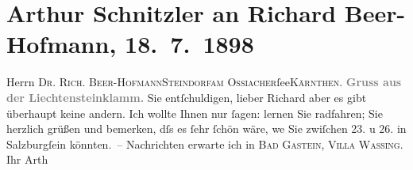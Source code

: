 

         
         \renewcommand{\erwaehntePersonen}{Personen: Richard Beer-Hofmann}
         \renewcommand{\erwaehnteOrte}{Orte: Kärnten, Liechtensteinklamm, Ossiacher See, Salzburg, St. Johann im Pongau, Steindorf am Ossiacher See, Villa Dr. Wassing}
         \renewcommand{\erwaehnteWerke}{}
               \section[Arthur Schnitzler an Richard Beer-Hofmann, 18. 7. 1898]{ Arthur Schnitzler an Richard Beer-Hofmann, 18. 7. 1898}\nopagebreak{}\rehead{ }\begin{ledgroupsized}[t]{13cm}\normalsize\beginnumbering \toendnotes[C]{\smallbreak\pagebreak[2]} 
\pstart{}{\pb}Herrn \textsc{Dr. Rich.
                     Beer-Hofmann}\pend{}\pstart{}\textsc{Steindorf}\pend{}\pstart{}\textsc{am Ossiacher}ſee\pend{}\pstart{}\textsc{Kärnthen}.\pend{}{\bigskip}\pstart
           \noindent{}\centering{}\textcolor{gray}{\textbf{{\pb}Gruss aus der Liechtensteinklamm.}}\pend
           \pstart
           Sie entſchuldigen, lieber Richard aber es gibt überhaupt keine andern. Ich wollte
               Ihnen nur ſagen: lernen Sie radfahren; Sie herzlich grüßen und bemerken, dſs es ſehr
               ſchön wäre, we{\geminationn}{ }Sie zwiſchen 23. u 26. in
                  Salzburgſein könnten. – Nachrichten erwarte ich in \textsc{Bad Gastein, Villa Wassing}.\pend
           \pstart Ihr \spacefill\mbox{Arth}\pend{}
         
         \endnumbering{}\end{ledgroupsized}  \newcommand{\dateiname}{L00822}\newcommand{\titel}{Arthur Schnitzler an Richard Beer-Hofmann, 18. 7. 1898}\newcommand{\editorInnen}{Martin Anton Müller und Gerd-Hermann Susen}
      